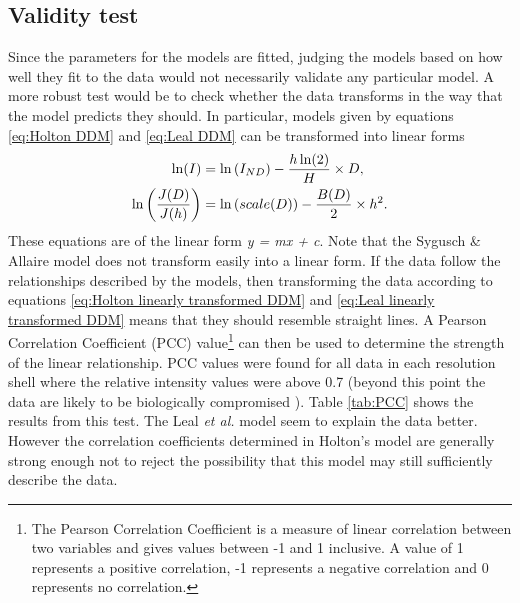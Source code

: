 \subsection{Validity test}
\label{sub:Validity Test}
Since the parameters for the models are fitted, judging the models based on how well they fit to the data would not necessarily validate any particular model.
A more robust test would be to check whether the data transforms in the way that the model predicts they should.
In particular, models given by equations \ref{eq:Holton DDM} and \ref{eq:Leal DDM} can be transformed into linear forms
\begin{align}
\ln(I)                          &= \ln\left( I_{ND} \right) - \frac{h \ln(2)}{H} \times D \label{eq:Holton linearly transformed DDM}, \\
\ln \left(\frac{J(D)}{J(h)}\right) &= \ln\left( scale(D) \right) - \frac{B(D)}{2} \times h^2 \label{eq:Leal linearly transformed DDM}. \\
\end{align}
These equations are of the linear form \textit{y = mx + c}.
Note that the Sygusch \& Allaire model does not transform easily into a linear form.
If the data follow the relationships described by the models, then transforming the data according to equations \ref{eq:Holton linearly transformed DDM} and \ref{eq:Leal linearly transformed DDM} means that they should resemble straight lines.
A Pearson Correlation Coefficient (PCC) value\footnote{The Pearson Correlation Coefficient is a measure of linear correlation between two variables and gives values between -1 and 1 inclusive.
A value of 1 represents a positive correlation, -1 represents a negative correlation and 0 represents no correlation.} can then be used to determine the strength of the linear relationship.
PCC values were found for all data in each resolution shell where the relative intensity values were above 0.7 (beyond this point the data are likely to be biologically compromised \cite{owen2006}).
Table \ref{tab:PCC} shows the results from this test.
The Leal \emph{et al.} model seem to explain the data better.
However the correlation coefficients determined in Holton's model are generally strong enough not to reject the possibility that this model may still sufficiently describe the data.
